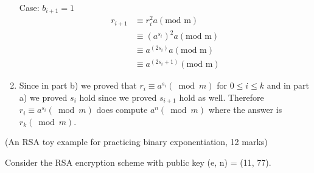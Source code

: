 \documentclass{assignment}
\begin{document}
\begin{problemlist}
\begin{problem}
\begin{answer}
\begin{enumerate}[label=(\alph*)]
\begin{align*}
          \end{align*}
          Case: $b_{i+1} = 1$
          \begin{align*}
          	r_{i+1} &\equiv r_i^2 a (\text{mod m}) \\
            		&\equiv (a^{s_i})^2 a (\text{mod m}) \\
                    &\equiv a^{(2s_i)} a (\text{mod m}) \\
                    &\equiv a^{(2s_i+1)} (\text{mod m})
          \end{align*}
	\item Since in part b) we proved that $r_i \equiv a^{s_i} (\bmod m)$ for $0 \leq i \leq k$ and in part a) we proved $s_i$ hold since we proved $s_{i+1}$ hold as well. Therefore $r_i \equiv a^{s_i} (\bmod m)$ does compute  $a^n (\bmod m)$ where the answer is $r_k (\bmod m)$.
\end{enumerate}

\end{answer}
\end{problem}

\clearpage
\pbitem (An RSA toy example for practicing binary exponentiation, 12 marks) \par Consider the RSA encryption scheme with public key (e, n) = (11, 77).
\begin{problem}
\begin{answer}



\end{answer}
\end{problem}
\end{problemlist}
\end{document}

